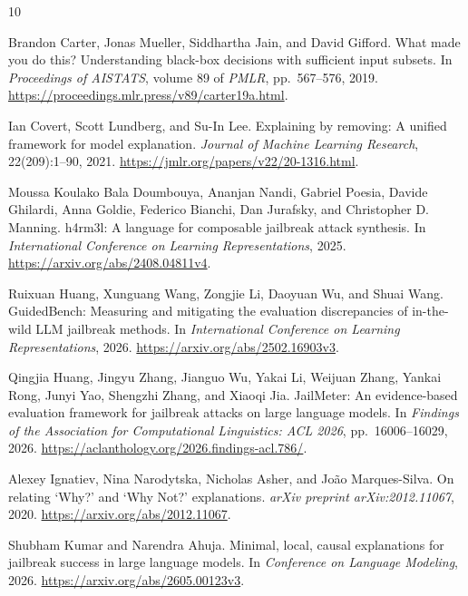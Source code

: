 \documentclass{article}
\begin{document}
\begin{thebibliography}{10}

Brandon Carter, Jonas Mueller, Siddhartha Jain, and David Gifford.
What made you do this? Understanding black-box decisions with sufficient
input subsets.
In \emph{Proceedings of AISTATS}, volume 89 of \emph{PMLR},
pp.\ 567--576, 2019.
\url{https://proceedings.mlr.press/v89/carter19a.html}.

Ian Covert, Scott Lundberg, and Su-In Lee.
Explaining by removing: A unified framework for model explanation.
\emph{Journal of Machine Learning Research}, 22(209):1--90, 2021.
\url{https://jmlr.org/papers/v22/20-1316.html}.

Moussa Koulako Bala Doumbouya, Ananjan Nandi, Gabriel Poesia, Davide Ghilardi,
Anna Goldie, Federico Bianchi, Dan Jurafsky, and Christopher D. Manning.
h4rm3l: A language for composable jailbreak attack synthesis.
In \emph{International Conference on Learning Representations}, 2025.
\url{https://arxiv.org/abs/2408.04811v4}.

Ruixuan Huang, Xunguang Wang, Zongjie Li, Daoyuan Wu, and Shuai Wang.
GuidedBench: Measuring and mitigating the evaluation discrepancies of
in-the-wild LLM jailbreak methods.
In \emph{International Conference on Learning Representations}, 2026.
\url{https://arxiv.org/abs/2502.16903v3}.

Qingjia Huang, Jingyu Zhang, Jianguo Wu, Yakai Li, Weijuan Zhang,
Yankai Rong, Junyi Yao, Shengzhi Zhang, and Xiaoqi Jia.
JailMeter: An evidence-based evaluation framework for jailbreak attacks on
large language models.
In \emph{Findings of the Association for Computational Linguistics: ACL 2026},
pp.\ 16006--16029, 2026.
\url{https://aclanthology.org/2026.findings-acl.786/}.

Alexey Ignatiev, Nina Narodytska, Nicholas Asher, and Jo\~ao Marques-Silva.
On relating `Why?' and `Why Not?' explanations.
\emph{arXiv preprint arXiv:2012.11067}, 2020.
\url{https://arxiv.org/abs/2012.11067}.

Shubham Kumar and Narendra Ahuja.
Minimal, local, causal explanations for jailbreak success in large language
models.
In \emph{Conference on Language Modeling}, 2026.
\url{https://arxiv.org/abs/2605.00123v3}.


\end{thebibliography}
\end{document}
